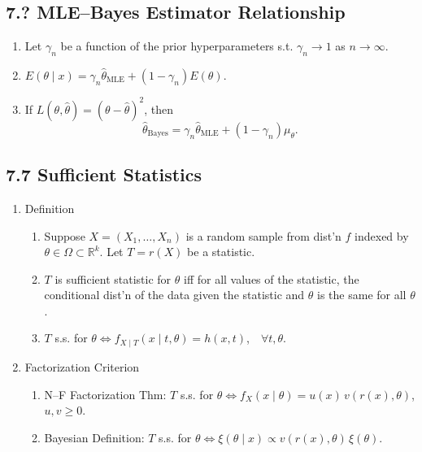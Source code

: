 \documentclass[11pt]{article}
\begin{document}
\subsection*{7.? MLE--Bayes Estimator Relationship}
\begin{enumerate}[label=\Alph*.]
  \item Let $\gamma_{n}$ be a function of the prior hyperparameters s.t. $\gamma_{n}\to 1$ as $n\to\infty$.
  \item $E(\theta\mid x)=\gamma_{n}\hat\theta_{\text{MLE}}+(1-\gamma_{n})E(\theta)$.
  \item If $L(\theta,\hat\theta)=(\theta-\hat\theta)^{2}$, then
  \[
    \hat\theta_{\text{Bayes}}=\gamma_{n}\hat\theta_{\text{MLE}}+(1-\gamma_{n})\mu_{\theta}.
  \]
\end{enumerate}

\subsection*{7.7 Sufficient Statistics}
\begin{enumerate}[label=\Roman*.]
  \item Definition
  \begin{enumerate}[label=\Alph*.]
    \item Suppose $X=(X_{1},\dots,X_{n})$ is a random sample from dist'n $f$ indexed by $\theta\in\Omega\subset\mathbb{R}^{k}$. Let $T=r(X)$ be a statistic.
    \item $T$ is sufficient statistic for $\theta$ iff for all values of the statistic, the conditional dist'n of the data given the statistic and $\theta$ is the same for all $\theta$.
    \item $T$ s.s. for $\theta \iff f_{X\mid T}(x\mid t,\theta)=h(x,t)$,\ \ $\forall t,\theta$.
  \end{enumerate}
  \item Factorization Criterion
  \begin{enumerate}[label=\Alph*.]
    \item N--F Factorization Thm: $T$ s.s. for $\theta \iff f_{X}(x\mid\theta)=u(x)\,v(r(x),\theta)$,\quad $u,v\ge 0$.
    \item Bayesian Definition: $T$ s.s. for $\theta \iff \xi(\theta\mid x)\propto v(r(x),\theta)\,\xi(\theta)$.
  \end{enumerate}
\end{enumerate}
\end{document}
